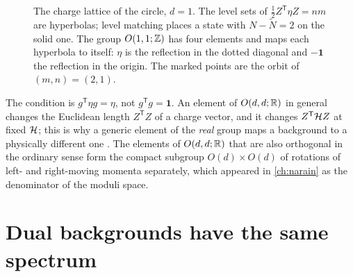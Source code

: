 \begin{figure}[t]
\centering
{}
\caption{The charge lattice of the circle, $d=1$. The level sets of
$\frac12Z^{\mathsf T}\eta Z=nm$ are hyperbolas; level matching places a state with
$N-\tilde N=2$ on the solid one. The group $O(1,1;\mathbb{Z})$ has four elements and maps each
hyperbola to itself: $\eta$ is the reflection in the dotted diagonal and $-\mathbf 1$ the
reflection in the origin. The marked points are the orbit of $(m,n)=(2,1)$.}
\label{fig:odd:d1}
\end{figure}

\begin{pitfallbox}
The condition is $g^{\mathsf T}\eta g=\eta$, not $g^{\mathsf T}g=\mathbf 1$. An element of
$O(d,d;\mathbb{R})$ in general changes the Euclidean length $Z^{\mathsf T}Z$ of a charge vector, and
it changes $Z^{\mathsf T}\mathcal{H} Z$ at fixed $\mathcal{H}$; this is why a generic element of the
\emph{real} group maps a background to a physically different one . The elements of $O(d,d;\mathbb{R})$ that are also orthogonal in the ordinary sense
form the compact subgroup $O(d)\times O(d)$ of rotations of left- and right-moving momenta
separately, which appeared in \cref{ch:narain} as the denominator of the moduli space.
\end{pitfallbox}

\section{Dual backgrounds have the same spectrum}\label{sec:odd:spectrum}


